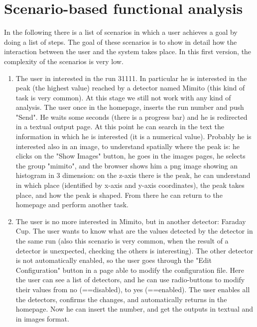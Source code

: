 \section{Scenario-based functional analysis}

In the following there is a list of scenarios in which a user achieves a goal by doing a list of steps. The goal of these scenarios is to show in detail how the interaction between the user and the system takes place. In this first version, the complexity of the scenarios is very low. 

\begin{enumerate}

\item The user in interested in the run 31111. In particular he is interested in the peak (the highest value) reached by a detector named Mimito (this kind of task is very common). At this stage we still not work with any kind of analysis. The user once in the homepage, inserts the run number and push "Send". He waits some seconds (there is a progress bar) and he is redirected in a textual output page. At this point he can search in the text the information in which he is interested (it is a numerical value). Probably he is interested also in an image, to understand spatially where the peak is: he clicks on the "Show Images" button, he goes in the images pages, he selects the group "mimito", and the browser shows him a png image showing an histogram in 3 dimension: on the z-axis there is the peak, he can understand in which place (identified by x-axis and y-axis coordinates), the peak takes place, and how the peak is shaped. From there he can return to the homepage and perform another task.   

\item The user is no more interested in Mimito, but in another detector: Faraday Cup. The user wants to know what are the values detected by the detector in the same run (also this scenario is very common, when the result of a detector is unexpected, checking the others is interesting). The other detector is not automatically enabled, so the user goes through the "Edit Configuration" button in a page able to modify the configuration file. Here the user can see a list of detectors, and he can use radio-buttons to modify their values from no (==disabled), to yes (==enabled). The user enables all the detectors, confirms the changes, and automatically returns in the homepage. Now he can insert the number, and get the outputs in textual and in images format.  



\end{enumerate}



